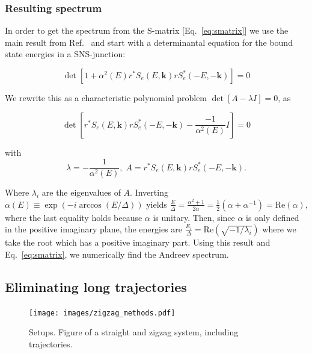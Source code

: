 		\subsubsection{Resulting spectrum}
			In order to get the spectrum from the S-matrix [Eq.~\eqref{eq:smatrix}] we use the main result from Ref.~\cite{beenakker1991universal} and start with a determinantal equation for the bound state energies in a SNS-junction:

			\begin{equation}
			\det\left[1+\alpha^{2}\left(E\right)r^{*}S_{e}\left(E,\bm{k}\right)rS_{e}^{*}\left(-E,-\bm{k}\right)\right]=0
			\end{equation}

			We rewrite this as a characteristic polynomial problem $\det\left[A-\lambda I\right]=0$, as

			\begin{equation}
			\det\left[r^{*}S_{e}\left(E,\bm{k}\right)rS_{e}^{*}\left(-E,-\bm{k}\right)-\frac{-1}{\alpha^{2}\left(E\right)}I\right]=0
			\end{equation}

			with
			\begin{equation}
			\lambda=-\frac{1}{\alpha^{2}\left(E\right)},\;A=r^{*}S_{e}\left(E,\bm{k}\right)rS_{e}^{*}\left(-E,-\bm{k}\right).
			\end{equation}

			Where $\lambda_i$ are the eigenvalues of $A$.
			Inverting $\alpha\left(E\right)\equiv\exp\left(-i\arccos\left(E/\Delta\right)\right)$ yields $\frac{E}{\Delta}=\frac{\alpha^{2}+1}{2\alpha}=\frac{1}{2}\left(\alpha+\alpha^{-1}\right)=\textrm{Re}(\alpha)$, where the last equality holds because $\alpha$ is unitary.
			Then, since $\alpha$ is only defined in the positive imaginary plane, the energies are $\frac{E_{i}}{\Delta}=\textrm{Re}\left(\sqrt{-1/\lambda_{i}}\right)$ where we take the root which has a positive imaginary part.
			Using this result and Eq.~\eqref{eq:smatrix}, we numerically find the Andreev spectrum.

	\subsection{Eliminating long trajectories}

		\begin{figure}[!htb]
		\centering
		\texttt{[image: images/zigzag\_methods.pdf]}
		\caption{Setups. Figure of a straight and zigzag system, including trajectories.
		\label{fig:zigzag_methods}}
		\end{figure}

